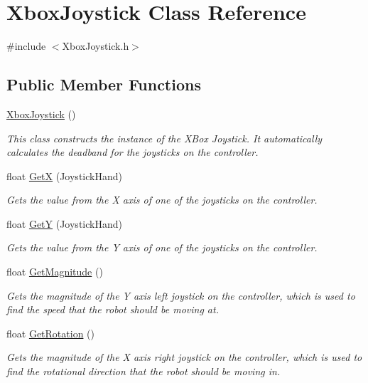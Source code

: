 \hypertarget{class_xbox_joystick}{\section{\-Xbox\-Joystick \-Class \-Reference}
\label{class_xbox_joystick}
}


{\ttfamily \#include $<$\-Xbox\-Joystick.\-h$>$}

\subsection*{\-Public \-Member \-Functions}
\begin{DoxyCompactItemize}
\item 
\hyperlink{class_xbox_joystick_a8592bd46942d57e14bd017eef9043159}{\-Xbox\-Joystick} ()
\begin{DoxyCompactList}\small\item\em \-This class constructs the instance of the \-X\-Box \-Joystick. \-It automatically calculates the deadband for the joysticks on the controller. \end{DoxyCompactList}\item 
float \hyperlink{class_xbox_joystick_a4192c8735c467d34c55074522fd3eeb1}{\-Get\-X} (\-Joystick\-Hand)
\begin{DoxyCompactList}\small\item\em \-Gets the value from the \-X axis of one of the joysticks on the controller. \end{DoxyCompactList}\item 
float \hyperlink{class_xbox_joystick_ab9f3fda49ebdf9fdec67b28726d3b910}{\-Get\-Y} (\-Joystick\-Hand)
\begin{DoxyCompactList}\small\item\em \-Gets the value from the \-Y axis of one of the joysticks on the controller. \end{DoxyCompactList}\item 
float \hyperlink{class_xbox_joystick_ad3c40b7a658f9d76615c82b96ab33bd9}{\-Get\-Magnitude} ()
\begin{DoxyCompactList}\small\item\em \-Gets the magnitude of the \-Y axis left joystick on the controller, which is used to find the speed that the robot should be moving at. \end{DoxyCompactList}\item 
float \hyperlink{class_xbox_joystick_a4924f582087f3e3aa1ab59103c427bb8}{\-Get\-Rotation} ()
\begin{DoxyCompactList}\small\item\em \-Gets the magnitude of the \-X axis right joystick on the controller, which is used to find the rotational direction that the robot should be moving in. \end{DoxyCompactList}\end{DoxyCompactItemize}


